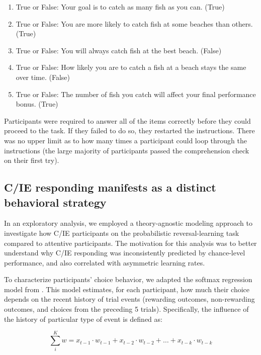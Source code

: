 \documentclass[a4paper,notitlepage,12pt]{article}
\begin{document}
\begin{enumerate}
    \item True or False: Your goal is to catch as many fish as you can. (True)
    \item True or False: You are more likely to catch fish at some beaches than others. (True)
    \item True or False: You will always catch fish at the best beach. (False)
    \item True or False: How likely you are to catch a fish at a beach stays the same over time. (False)
    \item True or False: The number of fish you catch will affect your final performance bonus. (True)
\end{enumerate}

Participants were required to answer all of the items correctly before they could proceed to the task. If they failed to do so, they restarted the instructions. There was no upper limit as to how many times a participant could loop through the instructions (the large majority of participants passed the comprehension check on their first try).

\subsection*{C/IE responding manifests as a distinct behavioral strategy}

In an exploratory analysis, we employed a theory-agnostic modeling approach to investigate how C/IE participants on the probabilistic reversal-learning task compared to attentive participants. The motivation for this analysis was to better understand why C/IE responding was inconsistently predicted by chance-level performance, and also correlated with asymmetric learning rates.  

To characterize participants' choice behavior, we adapted the softmax regression model from \cite{seymour2012serotonin}. This model estimates, for each participant, how much their choice depends on the recent history of trial events (rewarding outcomes, non-rewarding outcomes, and choices from the preceding 5 trials). Specifically, the influence of the history of particular type of event is defined as:

\begin{equation*}
    \sum_i^K w = x_{t-1} \cdot w_{t-1} + x_{t-2} \cdot w_{t-2} +  \ldots + x_{t-k} \cdot w_{t-k}
\end{equation*}
\end{document}
